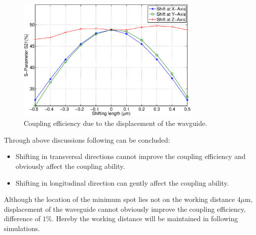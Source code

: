 \begin{figure}[!ht]
\centering
\includegraphics[width=0.8\textwidth]{bilder/shift_curve}
\caption{Coupling efficiency due to the displacement of the wavguide.}
\label{fig:shift_curve}
\end{figure}

Through above discussions following can be concluded:
\begin{itemize} 
\item Shifting in transversal directions cannot improve the coupling efficiency and obviously affect the coupling ability. 
\item Shifting in longitudinal direction can gently affect the coupling ability. 
\end{itemize}
Although the location of the minimum spot lies not on the working distance $4\mu$m, displacement of the waveguide cannot obviously improve the coupling efficiency, difference of $1\%$. Hereby the working distance will be maintained in following simulations.\\
